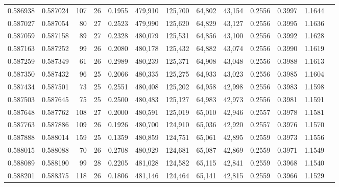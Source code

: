 \begin{tabular}{rrrrrrrrrrrrr}
0.586938 & 0.587024 & 107 &  26 &                                     0.1955 & 479,910 & 125,700 &  64,802 &  43,154 & 0.2556 & 0.3997 & 1.1644 \\
0.587027 & 0.587054 &  80 &  27 &                                     0.2523 & 479,990 & 125,620 &  64,829 &  43,127 & 0.2556 & 0.3995 & 1.1636 \\
0.587059 & 0.587158 &  89 &  27 &                                     0.2328 & 480,079 & 125,531 &  64,856 &  43,100 & 0.2556 & 0.3992 & 1.1628 \\
0.587163 & 0.587252 &  99 &  26 &                                     0.2080 & 480,178 & 125,432 &  64,882 &  43,074 & 0.2556 & 0.3990 & 1.1619 \\
0.587259 & 0.587349 &  61 &  26 &                                     0.2989 & 480,239 & 125,371 &  64,908 &  43,048 & 0.2556 & 0.3988 & 1.1613 \\
0.587350 & 0.587432 &  96 &  25 &                                     0.2066 & 480,335 & 125,275 &  64,933 &  43,023 & 0.2556 & 0.3985 & 1.1604 \\
0.587434 & 0.587501 &  73 &  25 &                                     0.2551 & 480,408 & 125,202 &  64,958 &  42,998 & 0.2556 & 0.3983 & 1.1598 \\
0.587503 & 0.587645 &  75 &  25 &                                     0.2500 & 480,483 & 125,127 &  64,983 &  42,973 & 0.2556 & 0.3981 & 1.1591 \\
0.587648 & 0.587762 & 108 &  27 &                                     0.2000 & 480,591 & 125,019 &  65,010 &  42,946 & 0.2557 & 0.3978 & 1.1581 \\
0.587763 & 0.587886 & 109 &  26 &                                     0.1926 & 480,700 & 124,910 &  65,036 &  42,920 & 0.2557 & 0.3976 & 1.1570 \\
0.587888 & 0.588014 & 159 &  25 &                                     0.1359 & 480,859 & 124,751 &  65,061 &  42,895 & 0.2559 & 0.3973 & 1.1556 \\
0.588015 & 0.588088 &  70 &  26 &                                     0.2708 & 480,929 & 124,681 &  65,087 &  42,869 & 0.2559 & 0.3971 & 1.1549 \\
0.588089 & 0.588190 &  99 &  28 &                                     0.2205 & 481,028 & 124,582 &  65,115 &  42,841 & 0.2559 & 0.3968 & 1.1540 \\
0.588201 & 0.588375 & 118 &  26 &                                     0.1806 & 481,146 & 124,464 &  65,141 &  42,815 & 0.2559 & 0.3966 & 1.1529 \\

\end{tabular}
